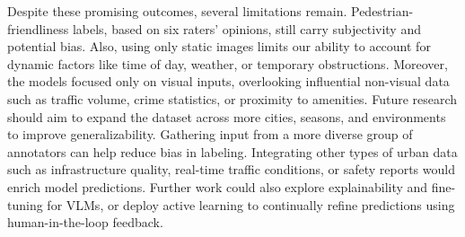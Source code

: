 \documentclass[11pt]{article}
\begin{document}
Despite these promising outcomes, several limitations remain. Pedestrian-friendliness labels, based on six raters’ opinions, still carry subjectivity and potential bias. Also, using only static images limits our ability to account for dynamic factors like time of day, weather, or temporary obstructions. Moreover, the models focused only on visual inputs, overlooking influential non-visual data such as traffic volume, crime statistics, or proximity to amenities. Future research should aim to expand the dataset across more cities, seasons, and environments to improve generalizability. Gathering input from a more diverse group of annotators can help reduce bias in labeling. Integrating other types of urban data such as infrastructure quality, real-time traffic conditions, or safety reports would enrich model predictions. Further work could also explore explainability and fine-tuning for VLMs, or deploy active learning to continually refine predictions using human-in-the-loop feedback. 









  
\end{document}

